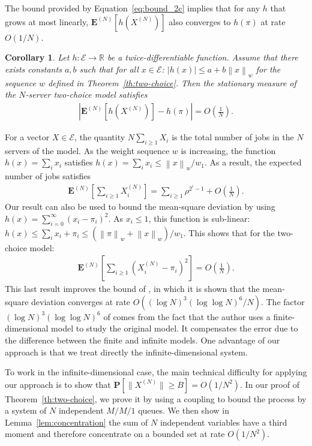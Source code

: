 \documentclass[sigconf]{acmart}
\newcommand\XN{X^{(N)}}
\newcommand\E{\mathcal{E}}
\newcommand\R{\mathbb{R}}
\newcommand\espN[1]{\mathbf{E}^{(N)}\left[#1\right]}
\newcommand\sespN[1]{\mathbf{E}^{(N)}[#1]}
\newcommand\sProba[1]{\mathbf{P}[#1]}
\newcommand\norm[1]{\left\|#1\right\|}
\newcommand\snorm[1]{\|#1\|}
\newcommand\abs[1]{\left|#1\right|}
\newcommand\p[1]{\left(#1\right)}
\newtheorem{coro}{Corollary}
\begin{document}
The bound provided by Equation~\eqref{eq:bound_2c} implies that for
any $h$ that grows at most linearly, $\sespN{h(\XN)}$ also converges
to $h(\pi)$ at rate $O(1/N)$.
\begin{coro}
  \label{coro:two-choice}
  Let $h:\E\to\R$ be a twice-differentiable function. Assume that
  there exists constants $a,b$ such that for all $x\in\E$:
  $|h(x)|\le a+b\norm{x}_w$ for the sequence $w$ defined in
  Theorem~\ref{th:two-choice}. Then the stationary measure of the
  $N$-server two-choice model satisfies
  \begin{align*}
    \abs{\espN{h(\XN)}-h(\pi)}=O\p{\frac1N}.
  \end{align*}
\end{coro}
For a vector $X\in\E$, the quantity
$N\sum_{i\ge 1}X_i$ is the total number of jobs in the $N$ servers of
the model. As the weight sequence $w$ is increasing, the function
$h(x)=\sum_ix_i$ satisfies $h(x)=\sum_ix_i\le \norm{x}_w/w_1$. As a
result, the expected number of jobs satisfies
\begin{align}
  \label{eq:avg_2c}
  \espN{\sum_{i\ge1}\XN_i} 
  = \sum_{i\ge1} \rho^{2^i-1} +
  O\p{\frac1N}.
\end{align}
Our result can also be used to bound the mean-square deviation by
using $h(x)=\sum_{i=0}^\infty(x_i-\pi_i)^2$. As $x_i\le1$, this
function is sub-linear:
$h(x)\le \sum_ix_i+\pi_i \le (\norm{\pi}_w + \norm{x}_w)/w_1$. This
shows that for the two-choice model:
\begin{align*}
  \espN{\sum_{i\ge1}(\XN_i-\pi_i)^2} = O\p{\frac1N}. 
\end{align*}
This last result improves the bound of \cite{ying2016twochoice}, in
which it is shown that the mean-square deviation
converges at rate $O((\log N)^3(\log\log N)^6 /N)$. The factor
$(\log N)^3(\log\log N)^6$ of \cite{ying2016twochoice} comes from the
fact that the author uses a finite-dimensional model to study the
original model.  It compensates the error due to the difference
between the finite and infinite models.  One advantage of our approach
is that we treat directly the infinite-dimensional system. 


To work in the infinite-dimensional case, the main technical
difficulty for applying our approach is to show that
$\sProba{\snorm{\XN}\ge B}=O(1/N^2)$. In our proof of
Theorem~\ref{th:two-choice}, we prove it by using a coupling to bound
the process by a system of $N$ independent $M/M/1$ queues. We then
show in Lemma~\ref{lem:concentration} the sum of $N$ independent
variables have a third moment and therefore concentrate on a bounded
set at rate $O(1/N^2)$.  
\end{document}

